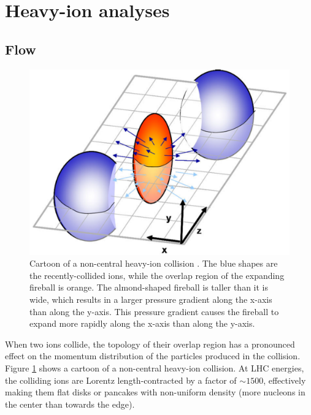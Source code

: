\section{Heavy-ion analyses}

\subsection{Flow}
\label{sec:Flow}

\begin{figure}[hbt]
\includegraphics[width=36pc]{Figures/BorrowedFigures/Almond.pdf}
\caption[Non-central collision]{ 
Cartoon of a non-central heavy-ion collision \cite{Rapp:2008qc}.
The blue shapes are the recently-collided ions, while the overlap region of the expanding fireball is orange.
The almond-shaped fireball is taller than it is wide, which results in a larger pressure gradient along the x-axis than along the y-axis.
This pressure gradient causes the fireball to expand more rapidly along the x-axis than along the y-axis.
}
\label{fig:Almond}
\end{figure}
When two ions collide, the topology of their overlap region has a pronounced effect on the momentum distribution of the particles produced in the collision.
Figure \ref{fig:Almond} shows a cartoon of a non-central heavy-ion collision.
At LHC energies, the colliding ions are Lorentz length-contracted by a factor of $\sim 1500$, effectively making them flat disks or pancakes with non-uniform density (more nucleons in the center than towards the edge).

